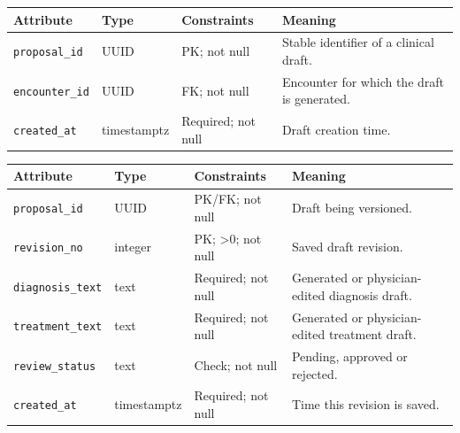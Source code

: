 \begin{reporttable}
\setlength{\tabcolsep}{5pt}
\centering
\small
\caption{Proposal attributes, types and constraints.}
\label{tab:kashaf:dict-proposal}
\begin{tabular}{|p{}|p{}|p{}|p{}|}
\hline
Attribute & Type & Constraints & Meaning \\ \hline
\texttt{proposal\_id} & UUID & PK; not null & Stable identifier of a clinical draft. \\ \hline
\texttt{encounter\_id} & UUID & FK; not null & Encounter for which the draft is generated. \\ \hline
\texttt{created\_at} & timestamptz & Required; not null & Draft creation time. \\ \hline
\end{tabular}
\end{reporttable}

\begin{reporttable}
\setlength{\tabcolsep}{5pt}
\centering
\small
\caption{ProposalRevision attributes, types and constraints.}
\label{tab:kashaf:dict-proposalrevision}
\begin{tabular}{|p{}|p{}|p{}|p{}|}
\hline
Attribute & Type & Constraints & Meaning \\ \hline
\texttt{proposal\_id} & UUID & PK/FK; not null & Draft being versioned. \\ \hline
\texttt{revision\_no} & integer & PK; >0; not null & Saved draft revision. \\ \hline
\texttt{diagnosis\_text} & text & Required; not null & Generated or physician-edited diagnosis draft. \\ \hline
\texttt{treatment\_text} & text & Required; not null & Generated or physician-edited treatment draft. \\ \hline
\texttt{review\_status} & text & Check; not null & Pending, approved or rejected. \\ \hline
\texttt{created\_at} & timestamptz & Required; not null & Time this revision is saved. \\ \hline
\end{tabular}
\end{reporttable}

